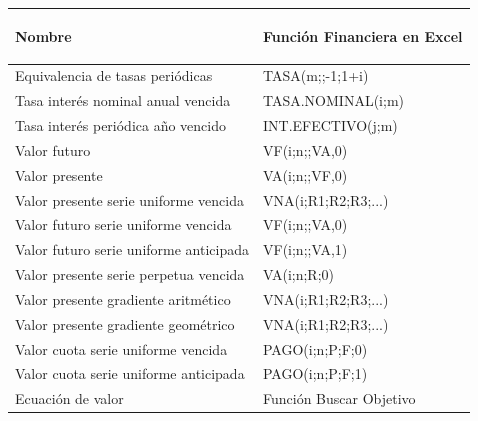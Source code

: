 \vspace{2cm}

\begin{spacing}{1}
\begin{center}
\begin{tabular}{ |p{7cm}|p{5.5cm}|}
\hline 
\rowcolor{orange!50}

\begin{center}\textbf{Nombre} \end{center}  & \begin{center} \textbf{Función Financiera en Excel} \end{center}  \\ \hline

Equivalencia de tasas periódicas &  TASA(m;;-1;1+i)\\\hline 

Tasa interés nominal anual vencida & TASA.NOMINAL(i;m) \\ \hline

Tasa interés periódica año vencido & INT.EFECTIVO(j;m) \\ \hline

Valor futuro & VF(i;n;;VA,0)\\ \hline 

Valor presente & VA(i;n;;VF,0)\\ \hline 

Valor presente serie uniforme vencida & VNA(i;R1;R2;R3;...) \\ \hline  

Valor futuro serie uniforme vencida &  VF(i;n;;VA,0)\\ \hline

Valor futuro serie uniforme anticipada & VF(i;n;;VA,1)\\ \hline 

Valor presente serie perpetua vencida & VA(i;n;R;0) \\ \hline

Valor presente gradiente aritmético & VNA(i;R1;R2;R3;...) \\ \hline

Valor presente gradiente geométrico & VNA(i;R1;R2;R3;...) \\ \hline

Valor cuota serie uniforme vencida & PAGO(i;n;P;F;0) \\ \hline

Valor cuota serie uniforme anticipada & PAGO(i;n;P;F;1) \\ \hline

Ecuación de valor & Función Buscar Objetivo\\ \hline


\end{tabular}
\end{center}
\end{spacing}

\clearpage